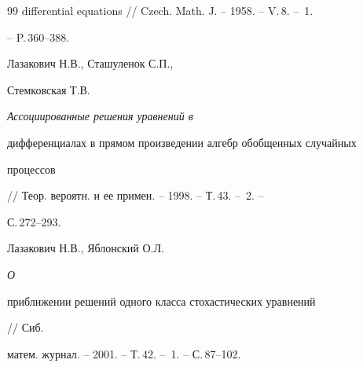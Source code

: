 \begin{thebibliography}{99}
{differential equations} // Czech. Math. J. -- 1958. -- V.\,8. -- \No\,1.


-- P.\,360--388.




Лазакович Н.В., Сташуленок С.П.,


Стемковская Т.В. {\em Ассоциированные решения уравнений в


дифференциалах в прямом произведении алгебр обобщенных случайных


процессов} // Теор. вероятн. и ее примен. -- 1998. -- Т.\,43. -- \No\,2. --


С.\,272--293.




Лазакович Н.В., Яблонский О.Л. {\em О


приближении решений одного класса стохастических уравнений} // Сиб.


матем. журнал. -- 2001. -- Т.\,42. -- \No\,1. -- С.\,87--102.





\end{thebibliography}





\vskip 2cm












\label{end}





